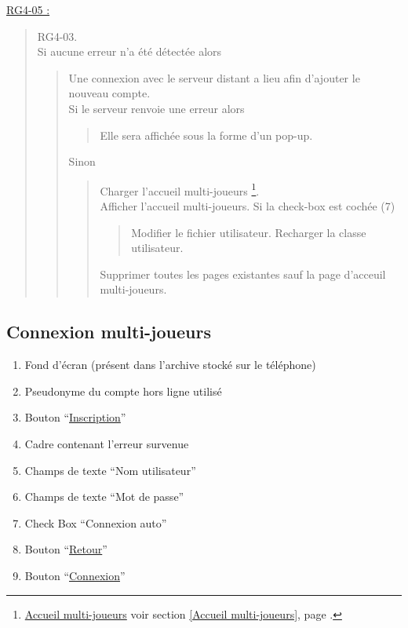 \documentclass{report}
\begin{document}
			\underline{RG4-05 :}
				\begin{quote}
					RG4-03.\\
					Si aucune erreur n'a été détectée alors
						\begin{quote}
							Une connexion avec le serveur distant a lieu afin d'ajouter le nouveau compte.\\
							Si le serveur renvoie une erreur alors
							\begin{quote}
								Elle sera affichée sous la forme d'un pop-up.
							\end{quote}	
							Sinon
							\begin{quote}
								Charger l'accueil multi-joueurs%
								\footnote[2]{
									\hyperlink{Accueil multi-joueurs}{Accueil multi-joueurs}
									\og voir section \ref{Accueil multi-joueurs}, page \pageref{Accueil multi-joueurs}.\fg
								}.\\
								Afficher l'accueil multi-joueurs\footnotemark[2].
								Si la check-box est cochée (7)
								\begin{quote}
									Modifier le fichier utilisateur.
									Recharger la classe utilisateur.
								\end{quote}
								Supprimer toutes les pages existantes sauf la page d'acceuil multi-joueurs\footnotemark[2].					
							\end{quote}
						\end{quote}
				\end{quote}
	
\newpage

	\subsection{Connexion multi-joueurs}
	
		\hypertarget{Connexion multi-joueurs}{}
		\label{Connexion multi-joueurs}
	
		\begin{center}
					
		\end{center}
		
		\begin{enumerate}
		  \item Fond d'écran (présent dans l'archive stocké sur le téléphone)
		  \item Pseudonyme du compte hors ligne utilisé
		  \item Bouton ``\hyperlink{Creation compte multi-joueurs}{Inscription}''
		  \item Cadre contenant l'erreur survenue
		  \item Champs de texte ``Nom utilisateur''
		  \item Champs de texte ``Mot de passe''
		  \item Check Box ``Connexion auto''
		  \item Bouton ``\hyperlink{Accueil}{Retour}''
		  \item Bouton ``\hyperlink{Accueil multi-joueurs}{Connexion}''
		\end{enumerate}
\end{document}
